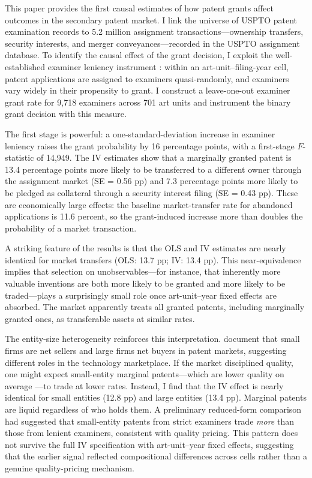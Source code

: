 \documentclass[12pt]{article}
\begin{document}
This paper provides the first causal estimates of how patent grants affect outcomes in the secondary patent market. I link the universe of USPTO patent examination records to 5.2 million assignment transactions---ownership transfers, security interests, and merger conveyances---recorded in the USPTO assignment database. To identify the causal effect of the grant decision, I exploit the well-established examiner leniency instrument \citep{sampat2019patents, farremensa2020patent, galasso2015patents}: within an art-unit--filing-year cell, patent applications are assigned to examiners quasi-randomly, and examiners vary widely in their propensity to grant. I construct a leave-one-out examiner grant rate for 9,718 examiners across 701 art units and instrument the binary grant decision with this measure.

The first stage is powerful: a one-standard-deviation increase in examiner leniency raises the grant probability by 16 percentage points, with a first-stage $F$-statistic of 14,949. The IV estimates show that a marginally granted patent is 13.4 percentage points more likely to be transferred to a different owner through the assignment market (SE = 0.56 pp) and 7.3 percentage points more likely to be pledged as collateral through a security interest filing (SE = 0.43 pp). These are economically large effects: the baseline market-transfer rate for abandoned applications is 11.6 percent, so the grant-induced increase more than doubles the probability of a market transaction.

A striking feature of the results is that the OLS and IV estimates are nearly identical for market transfers (OLS: 13.7 pp; IV: 13.4 pp). This near-equivalence implies that selection on unobservables---for instance, that inherently more valuable inventions are both more likely to be granted and more likely to be traded---plays a surprisingly small role once art-unit--year fixed effects are absorbed. The market apparently treats all granted patents, including marginally granted ones, as transferable assets at similar rates.

The entity-size heterogeneity reinforces this interpretation. \citet{figueroa2019patent} document that small firms are net sellers and large firms net buyers in patent markets, suggesting different roles in the technology marketplace. If the market disciplined quality, one might expect small-entity marginal patents---which are lower quality on average \citep{frakes2017time}---to trade at lower rates. Instead, I find that the IV effect is nearly identical for small entities (12.8 pp) and large entities (13.4 pp). Marginal patents are liquid regardless of who holds them. A preliminary reduced-form comparison had suggested that small-entity patents from strict examiners trade \textit{more} than those from lenient examiners, consistent with quality pricing. This pattern does not survive the full IV specification with art-unit--year fixed effects, suggesting that the earlier signal reflected compositional differences across cells rather than a genuine quality-pricing mechanism.
\end{document}
